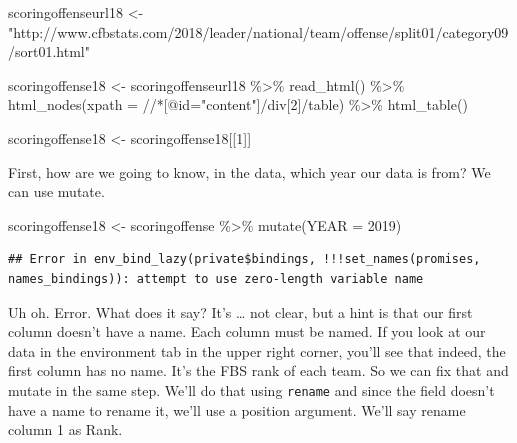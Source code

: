 \documentclass[
]{book}
\newenvironment{Shaded}{\begin{snugshade}}{\end{snugshade}}
\newcommand{\AttributeTok}[1]{\textcolor[rgb]{0.77,0.63,0.00}{#1}}
\newcommand{\DecValTok}[1]{\textcolor[rgb]{0.00,0.00,0.81}{#1}}
\newcommand{\FunctionTok}[1]{\textcolor[rgb]{0.00,0.00,0.00}{#1}}
\newcommand{\NormalTok}[1]{#1}
\newcommand{\OtherTok}[1]{\textcolor[rgb]{0.56,0.35,0.01}{#1}}
\newcommand{\SpecialCharTok}[1]{\textcolor[rgb]{0.00,0.00,0.00}{#1}}
\newcommand{\StringTok}[1]{\textcolor[rgb]{0.31,0.60,0.02}{#1}}
\begin{document}
\begin{Shaded}
\begin{Highlighting}[]
\NormalTok{scoringoffenseurl18 }\OtherTok{\textless{}{-}} \StringTok{"http://www.cfbstats.com/2018/leader/national/team/offense/split01/category09/sort01.html"}

\NormalTok{scoringoffense18 }\OtherTok{\textless{}{-}}\NormalTok{ scoringoffenseurl18 }\SpecialCharTok{\%\textgreater{}\%}
  \FunctionTok{read\_html}\NormalTok{() }\SpecialCharTok{\%\textgreater{}\%}
  \FunctionTok{html\_nodes}\NormalTok{(}\AttributeTok{xpath =} \StringTok{\textquotesingle{}//*[@id="content"]/div[2]/table\textquotesingle{}}\NormalTok{) }\SpecialCharTok{\%\textgreater{}\%}
  \FunctionTok{html\_table}\NormalTok{()}

\NormalTok{scoringoffense18 }\OtherTok{\textless{}{-}}\NormalTok{ scoringoffense18[[}\DecValTok{1}\NormalTok{]]}
\end{Highlighting}
\end{Shaded}

First, how are we going to know, in the data, which year our data is from? We can use mutate.

\begin{Shaded}
\begin{Highlighting}[]
\NormalTok{scoringoffense18 }\OtherTok{\textless{}{-}}\NormalTok{ scoringoffense }\SpecialCharTok{\%\textgreater{}\%} \FunctionTok{mutate}\NormalTok{(}\AttributeTok{YEAR =} \DecValTok{2019}\NormalTok{)}
\end{Highlighting}
\end{Shaded}

\begin{verbatim}
## Error in env_bind_lazy(private$bindings, !!!set_names(promises, names_bindings)): attempt to use zero-length variable name
\end{verbatim}

Uh oh. Error. What does it say? It's \ldots{} not clear, but a hint is that our first column doesn't have a name. Each column must be named. If you look at our data in the environment tab in the upper right corner, you'll see that indeed, the first column has no name. It's the FBS rank of each team. So we can fix that and mutate in the same step. We'll do that using \texttt{rename} and since the field doesn't have a name to rename it, we'll use a position argument. We'll say rename column 1 as Rank.
\end{document}
